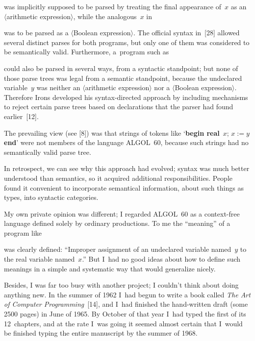 \noindent
was implicitly supposed to be parsed by treating the final appearance
of~$x$ as an 
$\langle$arithmetic expression$\rangle$, while the analogous~$x$ in


\noindent
was to be parsed as a $\langle$Boolean expression$\rangle$. The 
official syntax
in~[28] allowed several distinct parses for both programs, but
only one of them was considered to be semantically valid. Furthermore,
a~program such as


\noindent
could also be parsed in several ways, from a syntactic standpoint; but
none of those parse trees was legal from a semantic standpoint,
because the undeclared variable~$y$ was neither an $\langle$arithmetic
expression$\rangle$ nor a $\langle$Boolean expression$\rangle$.
Therefore Irons developed his syntax-directed approach by including
mechanisms to reject certain parse trees based on declarations that
the parser had found earlier~[12].

The prevailing view (see [8]) was that strings of tokens like 
`{\bf begin real}~$x$; $x:=y$ {\bf end}' were not members of the
language 
{\ninerm ALGOL}~60, because such strings had no 
semantically valid parse tree.

In retrospect, we can see why this approach had evolved; syntax was
much better understood than semantics, so it acquired additional
responsibilities. People found it convenient to incorporate semantical
information,
 about such things as types, into syntactic categories.

My own private opinion was different; I regarded 
{\ninerm ALGOL}~60 as a
context-free language defined solely by ordinary productions. 
To me the
``meaning'' of a program like


\noindent
was clearly defined: ``Improper assignment of an undeclared variable
named~$y$ to the real variable named~$x$.'' But I~had no good ideas
about how to define such meanings in a simple and systematic way that
would generalize nicely.

Besides, I was far too busy with another project; I couldn't think
about doing anything new. In the summer of 1962 I~had begun to write a
book called {\sl The Art of Computer Programming\/}~[14],
 and I~had finished the hand-written draft (some 2500 pages)
in June of 1965. By October of that year I~had typed the first of its
12~chapters, and at the rate I~was going it seemed almost certain that
I~would be finished typing the entire manuscript by the summer of
1968.

